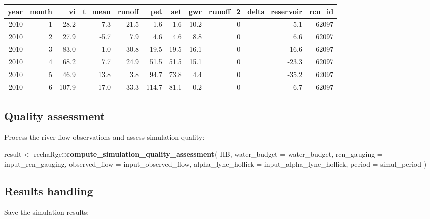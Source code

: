 \documentclass[
]{book}
\newenvironment{Shaded}{\begin{snugshade}}{\end{snugshade}}
\newcommand{\AttributeTok}[1]{\textcolor[rgb]{0.13,0.29,0.53}{#1}}
\newcommand{\FunctionTok}[1]{\textcolor[rgb]{0.13,0.29,0.53}{\textbf{#1}}}
\newcommand{\NormalTok}[1]{#1}
\newcommand{\OtherTok}[1]{\textcolor[rgb]{0.56,0.35,0.01}{#1}}
\newcommand{\SpecialCharTok}[1]{\textcolor[rgb]{0.81,0.36,0.00}{\textbf{#1}}}
\begin{document}
\begin{tabular}{r|r|r|r|r|r|r|r|r|r|r}
\hline
year & month & vi & t\_mean & runoff & pet & aet & gwr & runoff\_2 & delta\_reservoir & rcn\_id\\
\hline
2010 & 1 & 28.2 & -7.3 & 21.5 & 1.6 & 1.6 & 10.2 & 0 & -5.1 & 62097\\
\hline
2010 & 2 & 27.9 & -5.7 & 7.9 & 4.6 & 4.6 & 8.8 & 0 & 6.6 & 62097\\
\hline
2010 & 3 & 83.0 & 1.0 & 30.8 & 19.5 & 19.5 & 16.1 & 0 & 16.6 & 62097\\
\hline
2010 & 4 & 68.2 & 7.7 & 24.9 & 51.5 & 51.5 & 15.1 & 0 & -23.3 & 62097\\
\hline
2010 & 5 & 46.9 & 13.8 & 3.8 & 94.7 & 73.8 & 4.4 & 0 & -35.2 & 62097\\
\hline
2010 & 6 & 107.9 & 17.0 & 33.3 & 114.7 & 81.1 & 0.2 & 0 & -6.7 & 62097\\
\hline
\end{tabular}

\hypertarget{quality-assessment}{%
\subsection{Quality assessment}\label{quality-assessment}}

Process the river flow observations and assess simulation quality:

\begin{Shaded}
\begin{Highlighting}[]
\NormalTok{result }\OtherTok{\textless{}{-}}\NormalTok{ rechaRge}\SpecialCharTok{::}\FunctionTok{compute\_simulation\_quality\_assessment}\NormalTok{(}
\NormalTok{  HB,}
  \AttributeTok{water\_budget =}\NormalTok{ water\_budget,}
  \AttributeTok{rcn\_gauging =}\NormalTok{ input\_rcn\_gauging,}
  \AttributeTok{observed\_flow =}\NormalTok{ input\_observed\_flow,}
  \AttributeTok{alpha\_lyne\_hollick =}\NormalTok{ input\_alpha\_lyne\_hollick,}
  \AttributeTok{period =}\NormalTok{ simul\_period}
\NormalTok{)}
\end{Highlighting}
\end{Shaded}

\hypertarget{results-handling}{%
\subsection{Results handling}\label{results-handling}}

Save the simulation results:
\end{document}
